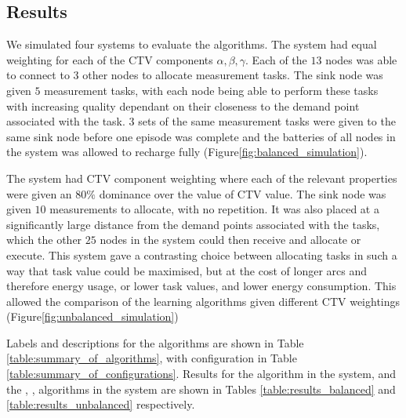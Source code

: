 \subsection{Results}

We simulated four systems to evaluate the algorithms. The \simulationSimple{}{} system had equal weighting for each of the CTV components $\alpha, \beta, \gamma$. Each of the $13$ nodes was able to connect to $3$ other nodes to allocate measurement tasks. The sink node was given $5$ measurement tasks, with each node being able to perform these tasks with increasing quality dependant on their closeness to the demand point associated with the task. $3$ sets of the same measurement tasks were given to the same sink node before one episode was complete and the batteries of all nodes in the system was allowed to recharge fully (Figure\ref{fig:balanced_simulation}). 

The \simulationExtended{}{} system had CTV component weighting where each of the relevant properties were given an $80\%$ dominance over the value of CTV value. The sink node was given $10$ measurements to allocate, with no repetition. It was also placed at a significantly large distance from the demand points associated with the tasks, which the other $25$ nodes in the system could then receive and allocate or execute. This system gave a contrasting choice between allocating tasks in such a way that task value could be maximised, but at the cost of longer arcs and therefore energy usage, or lower task values, and lower energy consumption. This allowed the comparison of the learning algorithms given different CTV weightings (Figure\ref{fig:unbalanced_simulation})

Labels and descriptions for the algorithms are shown in Table \ref{table:summary_of_algorithms}, with configuration in Table \ref{table:summary_of_configurations}. Results for the \algorithmBalanced{}{} algorithm in the \simulationSimple{}{} system, and the \algorithmEnergy{}{}, \algorithmQuality{}{}, \algorithmDistribution{}{} algorithms in the \simulationExtended{}{} system are shown in Tables \ref{table:results_balanced} and \ref{table:results_unbalanced} respectively.

